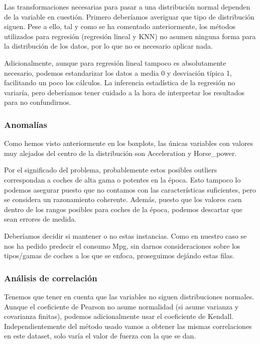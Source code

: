 Las transformaciones necesarias para pasar a una distribución normal dependen de la variable en cuestión. Primero deberíamos averiguar que tipo de distribución siguen.
Pese a ello, tal y como se ha comentado anteriormente, los métodos utilizados para regresión (regresión lineal y KNN) no asumen ninguna forma para la distribución de los datos, por lo que no es necesario aplicar nada.

Adicionalmente, aunque para regresión lineal tampoco es absolutamente necesario, podemos estandarizar los datos a media 0 y desviación típica 1, facilitando un poco los cálculos. La inferencia estadística de la regresión no variaría, pero deberíamos tener cuidado a la hora de interpretar los resultados para no confundirnos.

\subsubsection{Anomalías}
Como hemos visto anteriormente en los boxplots, las únicas variables con valores muy alejados del centro de la distribución son Acceleration y Horse\_power.

\vspace{\baselineskip}

Por el significado del problema, probablemente estos posibles outliers correspondan a coches de alta gama o potentes en la época. Esto tampoco lo podemos asegurar puesto que no contamos con las características suficientes, pero se considera un razonamiento coherente. Además, puesto que los valores caen dentro de los rangos posibles para coches de la época, podemos descartar que sean errores de medida.

Deberíamos decidir si mantener o no estas instancias. Como en nuestro caso se nos ha pedido predecir el consumo Mpg, sin darnos consideraciones sobre los tipos/gamas de coches a los que se enfoca, proseguimos dejándo estas filas.

\subsubsection{Análisis de correlación}

Tenemos que tener en cuenta que las variables no siguen distribuciones normales. Aunque el coeficiente de Pearson no asume normalidad (si asume varianza y covarianza finitas), podemos adicionalmente usar el coeficiente de Kendall. Independientemente del método usado vamos a obtener las mismas correlaciones en este dataset, solo varía el valor de fuerza con la que se dan.

